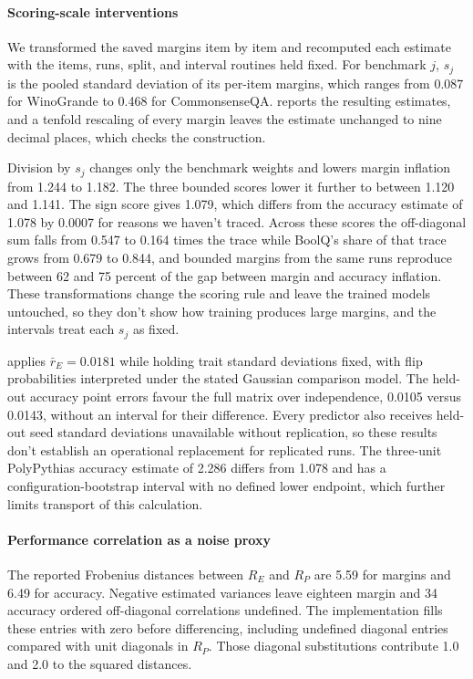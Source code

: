 \paragraph{Scoring-scale interventions}
\label{app:scale}
We transformed the saved margins item by item and recomputed each estimate with the items, runs, split, and interval routines held fixed. For benchmark $j$, $s_j$ is the pooled standard deviation of its per-item margins, which ranges from 0.087 for WinoGrande to 0.468 for CommonsenseQA.  reports the resulting estimates, and a tenfold rescaling of every margin leaves the estimate unchanged to nine decimal places, which checks the construction.

Division by $s_j$ changes only the benchmark weights and lowers margin inflation from 1.244 to 1.182. The three bounded scores lower it further to between 1.120 and 1.141. The sign score gives 1.079, which differs from the accuracy estimate of 1.078 by 0.0007 for reasons we haven't traced. Across these scores the off-diagonal sum falls from 0.547 to 0.164 times the trace while BoolQ's share of that trace grows from 0.679 to 0.844, and bounded margins from the same runs reproduce between 62 and 75 percent of the gap between margin and accuracy inflation. These transformations change the scoring rule and leave the trained models untouched, so they don't show how training produces large margins, and the intervals treat each $s_j$ as fixed.

 applies $\bar r_E=0.0181$ while holding trait standard deviations fixed, with flip probabilities interpreted under the stated Gaussian comparison model. The held-out accuracy point errors favour the full matrix over independence, 0.0105 versus 0.0143, without an interval for their difference. Every predictor also receives held-out seed standard deviations unavailable without replication, so these results don't establish an operational replacement for replicated runs. The three-unit PolyPythias accuracy estimate of 2.286 differs from 1.078 and has a configuration-bootstrap interval with no defined lower endpoint, which further limits transport of this calculation.

\paragraph{Performance correlation as a noise proxy}
The reported Frobenius distances between $R_E$ and $R_P$ are 5.59 for margins and 6.49 for accuracy. Negative estimated variances leave eighteen margin and 34 accuracy ordered off-diagonal correlations undefined. The implementation fills these entries with zero before differencing, including undefined diagonal entries compared with unit diagonals in $R_P$. Those diagonal substitutions contribute 1.0 and 2.0 to the squared distances.

